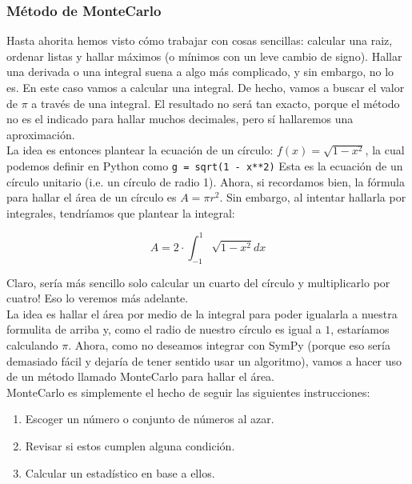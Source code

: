 \documentclass[10pt,letterpaper]{article}
\newcommand{\inlinecode}[1]{
\colorbox{light-gray}{\texttt{#1}}
}
\begin{document}
\subsubsection{M\'etodo de MonteCarlo}
Hasta ahorita hemos visto c\'omo trabajar con cosas sencillas: calcular una raiz, ordenar listas y hallar m\'aximos (o m\'inimos con un leve cambio de signo). Hallar una derivada o una integral suena a algo m\'as complicado, y sin embargo, no lo es. En este caso vamos a calcular una integral. De hecho, vamos a buscar el valor de $\pi$ a trav\'es de una integral. El resultado no ser\'a tan exacto, porque el m\'etodo no es el indicado para hallar muchos decimales, pero s\'i hallaremos una aproximaci\'on.\\

La idea es entonces plantear la ecuaci\'on de un c\'irculo: $f\! \left(x\right) = \sqrt{1 - x^2}$, la cual podemos definir en Python como \inlinecode{g = sqrt(1 - x**2)} Esta es la ecuaci\'on de un c\'irculo unitario (i.e. un c\'irculo de radio 1). Ahora, si recordamos bien, la f\'ormula para hallar el \'area de un c\'irculo es $A = \pi r^2$. Sin embargo, al intentar hallarla por integrales, tendr\'iamos que plantear la integral:

\begin{equation}
A = 2 \cdot \int_{-1}^{1} \sqrt{1 - x^2}  dx
\end{equation}

\noindent Claro, ser\'ia m\'as sencillo solo calcular un cuarto del c\'irculo y multiplicarlo por cuatro! Eso lo veremos m\'as adelante.\\

La idea es hallar el \'area por medio de la integral para poder igualarla a nuestra formulita de arriba y, como el radio de nuestro c\'irculo es igual a $1$, estar\'iamos calculando $\pi$. Ahora, como no deseamos integrar con SymPy (porque eso ser\'ia demasiado f\'acil y dejar\'ia de tener sentido usar un algoritmo), vamos a hacer uso de un m\'etodo llamado MonteCarlo para hallar el \'area.\\

\noindent MonteCarlo es simplemente el hecho de seguir las siguientes instrucciones:

\begin{enumerate}
\item Escoger un n\'umero o conjunto de n\'umeros al azar.
\item Revisar si estos cumplen alguna condici\'on.
\item Calcular un estad\'istico en base a ellos.
\end{enumerate}
\end{document}
